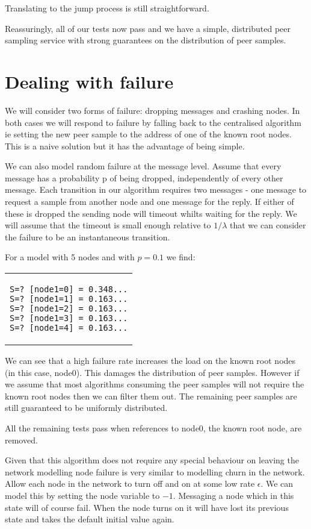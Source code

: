\documentclass[a4paper,10pt]{article}
\newcommand{\code}[1]{
  \footnotesize
  
}
\newcommand{\prismmodel}[1]{
  \begin{quotation}
  \code{../models/#1.sm}
  \end{quotation}
}
\newenvironment{prismprop}[0]{
  \begin{center}
  \begin{tabular}{c}
  \footnotesize
}{
  \end{tabular}
  \end{center}
}
\begin{document}
Translating to the jump process is still straightforward.

\prismmodel{dtmc_full}

Reassuringly, all of our tests now pass and we have a simple, distributed peer sampling service with strong guarantees on the distribution of peer samples.

\section{Dealing with failure}

We will consider two forms of failure: dropping messages and crashing nodes. In both cases we will respond to failure by falling back to the centralised algorithm ie setting the new peer sample to the address of one of the known root nodes. This is a naive solution but it has the advantage of being simple. 

We can also model random failure at the message level. Assume that every message has a probability p of being dropped, independently of every other message. Each transition in our algorithm requires two messages - one message to request a sample from another node and one message for the reply. If either of these is dropped the sending node will timeout whilts waiting for the reply. We will assume that the timeout is small enough relative to $1/\lambda$ that we can consider the failure to be an instantaneous transition.

\prismmodel{ctmc_full_error}

For a model with 5 nodes and with $p=0.1$ we find:

\begin{prismprop}
\begin{lstlisting}
S=? [node1=0] = 0.348...
S=? [node1=1] = 0.163...
S=? [node1=2] = 0.163...
S=? [node1=3] = 0.163...
S=? [node1=4] = 0.163...
\end{lstlisting}
\end{prismprop}

We can see that a high failure rate increases the load on the known root nodes (in this case, node0). This damages the distribution of peer samples. However if we assume that most algorithms consuming the peer samples will not require the known root nodes then we can filter them out. The remaining peer samples are still guaranteed to be uniformly distributed.

All the remaining tests pass when references to node0, the known root node, are removed.

Given that this algorithm does not require any special behaviour on leaving the network modelling node failure is very similar to modelling churn in the network. Allow each node in the network to turn off and on at some low rate $\epsilon$. We can model this by setting the node variable to $-1$. Messaging a node which in this state will of course fail. When the node turns on it will have lost its previous state and takes the default initial value again.
\end{document}
